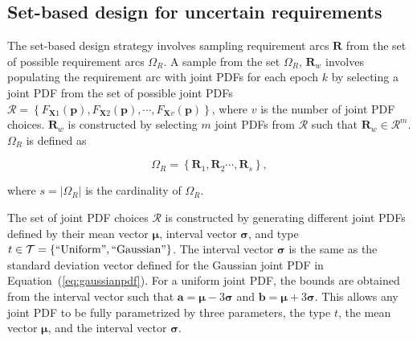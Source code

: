 \subsection{Set-based design for uncertain requirements} \label{subsec:SBDproblem}


The set-based design strategy involves sampling requirement arcs $\mathbf{R}$ from the set of possible requirement arcs $\Omega_R$. A sample from the set $\Omega_R$, $\mathbf{R}_w$ involves populating the requirement arc with joint \acp{PDF} for each epoch $k$ by selecting a joint \ac{PDF} from the set of possible joint \acp{PDF} $\mathcal{R} = \left\{F_{\mathbf{X}1}(\mathbf{p}),F_{\mathbf{X}2}(\mathbf{p}),\cdots,F_{\mathbf{X}v}(\mathbf{p})\right\}$, where $v$ is the number of joint \ac{PDF} choices. $\mathbf{R}_w$ is constructed by selecting $m$ joint \acp{PDF} from $\mathcal{R}$ such that $\mathbf{R}_w \in \mathcal{R}^m$. $\Omega_R$ is defined as

\begin{equation} \label{eq:Rarcsample}
	\Omega_R = \left\{\mathbf{R}_1,\mathbf{R}_2\cdots,\mathbf{R}_s\right\},
\end{equation}

where $s = |\Omega_R|$ is the cardinality of $\Omega_R$.

The set of joint \ac{PDF} choices $\mathcal{R}$ is constructed by generating different joint \acp{PDF} defined by their mean vector $\boldsymbol{\mu}$, interval vector $\boldsymbol{\sigma}$, and type $t\in\mathcal{T} = \left\{\mathrm{``Uniform"},\mathrm{``Gaussian"}\right\}$. The interval vector $\boldsymbol{\sigma}$ is the same as the standard deviation vector defined for the Gaussian joint \ac{PDF} in Equation~(\ref{eq:gaussianpdf}). For a uniform joint \ac{PDF}, the bounds are obtained from the interval vector such that $\mathbf{a} = \boldsymbol{\mu} - 3\boldsymbol{\sigma}$ and $\mathbf{b} = \boldsymbol{\mu} + 3\boldsymbol{\sigma}$. This allows any joint \ac{PDF} to be fully parametrized by three parameters, the type $t$, the mean vector $\boldsymbol{\mu}$, and the interval vector $\boldsymbol{\sigma}$.

